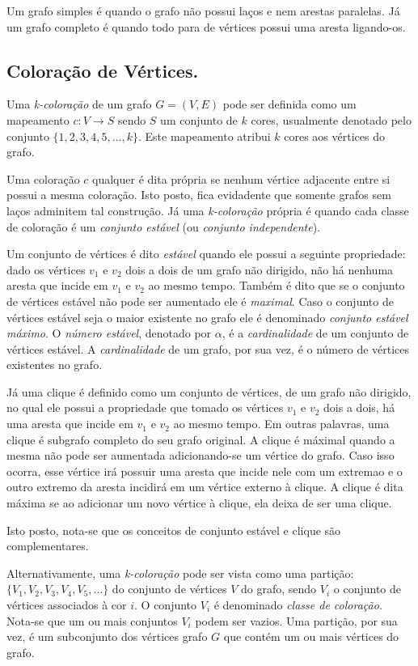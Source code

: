 \documentclass[12pt]{article}
\begin{document}
Um grafo simples é quando o grafo não possui laços e nem arestas paralelas. Já um grafo completo é quando todo para de vértices possui uma aresta ligando-os.

\subsection{Coloração de Vértices.}

Uma \emph{k-coloração} de um grafo $G =(V, E)$ pode ser definida como um mapeamento $c: V \rightarrow S$ sendo $S$ um conjunto de $k$ cores, usualmente denotado pelo conjunto $\{1, 2, 3, 4, 5, ..., k\}$. Este mapeamento atribui $k$ cores aos vértices do grafo.

Uma coloração $c$ qualquer é dita própria se nenhum vértice adjacente entre si possui a mesma coloração. Isto posto, fica evidadente que somente grafos sem laços adminitem tal construção. Já uma \emph{k-coloração} própria é quando cada classe de coloração é um \emph{conjunto estável} (ou \emph{conjunto independente}).

Um conjunto de vértices é dito \emph{estável} quando ele possui a seguinte propriedade: dado os vértices $v_1$ e $v_2$ dois a dois de um grafo não dirigido, não há nenhuma aresta que incide em $v_1$ e $v_2$ ao mesmo tempo. Também é dito que se o conjunto de vértices estável não pode ser aumentado ele é \emph{maximal}. Caso o conjunto de vértices estável seja o maior existente no grafo ele é denominado \emph{conjunto estável máximo}. O \emph{número estável}, denotado por $\alpha$, é a \emph{cardinalidade} de um conjunto de vértices estável. A \emph{cardinalidade} de um grafo, por sua vez, é o número de vértices existentes no grafo.

Já uma clique é definido como um conjunto de vértices, de um grafo não dirigido, no qual ele possui a propriedade que tomado os vértices $v_1$ e $v_2$ dois a dois, há uma aresta que incide em $v_1$ e $v_2$ ao mesmo tempo. Em outras palavras, uma clique é subgrafo completo do seu grafo original. A clique é máximal quando a mesma não pode ser aumentada adicionando-se um vértice do grafo. Caso isso ocorra, esse vértice irá possuir uma aresta que incide nele com um extremao e o outro extremo da aresta incidirá em um vértice externo à clique. A clique é dita máxima se ao adicionar um novo vértice à clique, ela deixa de ser uma clique.

Isto posto, nota-se que os conceitos de conjunto estável e clique são complementares.

Alternativamente, uma \emph{k-coloração} pode ser vista como uma partição: $\{V_1, V_2, V_3, V_4, V_5, ...\}$ do conjunto de vértices $V$ do grafo, sendo $V_i$ o conjunto de vértices associados à cor $i$. O conjunto $V_i$ é denominado \emph{classe de coloração}. Nota-se que um ou mais conjuntos $V_i$ podem ser vazios. Uma partição, por sua vez, é um subconjunto dos vértices grafo $G$ que contém um ou mais vértices do grafo.
\end{document}

